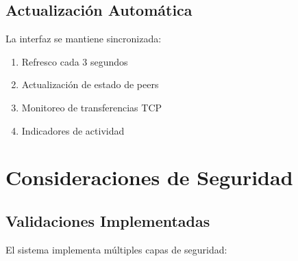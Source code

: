 \documentclass[12pt]{article}
\begin{document}
\subsection{Actualización Automática}
La interfaz se mantiene sincronizada:

\begin{enumerate}
    \item Refresco cada 3 segundos
    \item Actualización de estado de peers
    \item Monitoreo de transferencias TCP
    \item Indicadores de actividad
\end{enumerate}

\section{Consideraciones de Seguridad}
\subsection{Validaciones Implementadas}
El sistema implementa múltiples capas de seguridad:
\end{document}
